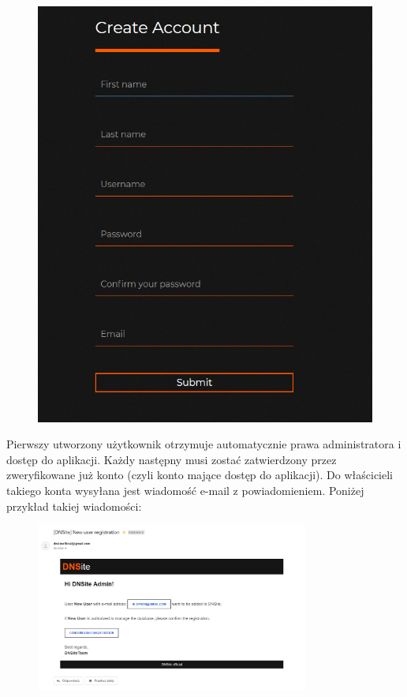 \documentclass[12pt] {article}
\begin{document}
\begin{figure}[H]
\centering
\includegraphics[scale=0.4]{res/4_rejestracja}
\end{figure}
Pierwszy utworzony użytkownik otrzymuje automatycznie prawa administratora i dostęp do aplikacji. Każdy następny musi zostać zatwierdzony przez zweryfikowane już konto (czyli konto mające dostęp do aplikacji). Do właścicieli takiego konta wysyłana jest wiadomość e-mail z powiadomieniem. Poniżej przykład takiej wiadomości:
\begin{figure}[H]
\centering
\includegraphics[width=0.8\textwidth]{res/5_mail_potwierdzenie}
\end{figure}
\end{document}
